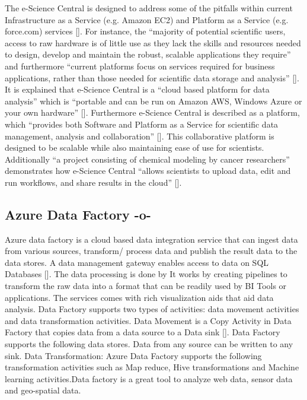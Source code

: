 The e-Science Central is designed to address some of the pitfalls
within current Infrastructure as a Service (e.g.  Amazon EC2) and
Platform as a Service (e.g. force.com)
services [\cite{e-science-central-paper-2010}]. For instance, the
``majority of potential scientific users, access to raw hardware is of
little use as they lack the skills and resources needed to design,
develop and maintain the robust, scalable applications they require''
and furthermore ``current platforms focus on services required for
business applications, rather than those needed for scientific data
storage and analysis'' [\cite{e-science-central-paper-2010}]. It is
explained that e-Science Central is a ``cloud based platform for data
analysis'' which is ``portable and can be run on Amazon AWS, Windows
Azure or your own hardware'' [\cite{www-e-science-central}].
Furthermore e-Science Central is described as a platform, which
``provides both Software and Platform as a Service for scientific data
management, analysis and collaboration''
 [\cite{e-science-central-paper-2010}]. This collaborative platform is
designed to be scalable while also maintaining ease of use for
scientists.  Additionally ``a project consisting of chemical modeling
by cancer researchers'' demonstrates how e-Science Central ``allows
scientists to upload data, edit and run workflows, and share results
in the cloud'' [\cite{e-science-central-paper-2010}].



\subsection{Azure Data Factory -o-}
    
Azure data factory is a cloud based data integration service that can
ingest data from various sources, transform/ process data and publish
the result data to the data stores. A data management gateway enables
access to data on SQL Databases [\cite{www-jamesserra}]. The data
processing is done by It works by creating pipelines to transform the
raw data into a format that can be readily used by BI Tools or
applications. The services comes with rich visualization aids that aid
data analysis. Data Factory supports two types of activities: data
movement activities and data transformation activities. Data Movement
is a Copy Activity in Data Factory that copies data from a data source
to a Data sink [\cite{www-microsoft-azure}]. Data Factory supports the
following data stores. Data from any source can be written to any
sink.  Data Transformation: Azure Data Factory supports the following
transformation activities such as Map reduce, Hive transformations and
Machine learning activities.Data factory is a great tool to analyze
web data, sensor data and geo-spatial data.



